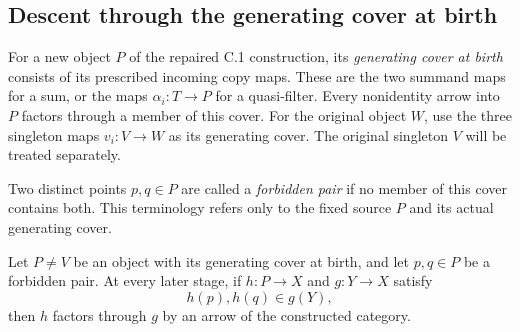 \subsection{Descent through the generating cover at birth}

For a new object $P$ of the repaired C.1 construction, its
\emph{generating cover at birth} consists of its prescribed incoming
copy maps.  These are the two summand maps for a sum, or the maps
$\alpha_i:T\to P$ for a quasi-filter.  Every nonidentity arrow into
$P$ factors through a member of this cover.  For the original
object $W$, use the three singleton maps $v_i:V\to W$ as its
generating cover.  The original singleton $V$ will be treated
separately.

Two distinct points $p,q\in P$ are called a \emph{forbidden pair}
if no member of this cover contains both.  This terminology refers
only to the fixed source $P$ and its actual generating cover.

\begin{lemma}
\label{C:birth-forbidden-pair}
Let $P\ne V$ be an object with its generating cover at birth, and
let $p,q\in P$ be a forbidden pair.  At every later stage, if
$h:P\to X$ and $g:Y\to X$ satisfy
\[
                         h(p),h(q)\in g(Y),
\]
then $h$ factors through $g$ by an arrow of the constructed
category.
\end{lemma}

